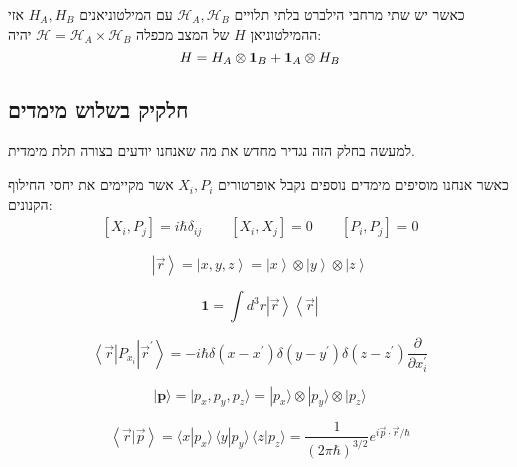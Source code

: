 \documentclass{tstextbook}
\begin{document}
\begin{proposition}
כאשר יש שתי מרחבי הילברט בלתי תלויים \(\mathcal{H}_{A},\mathcal{H}_{B}\) עם המילטוניאנים \(H_{A},H_{B}\) אזי ההמילטוניאן \(H\) של המצב מכפלה \(\mathcal{H}=\mathcal{H}_{A}\times \mathcal{H}_{B}\) יהיה:
$${ {H}}={ H}_{A}\otimes{\bf1}_{B}+{\bf1}_{A}\otimes{ H}_{B}$$

\end{proposition}
\subsection{חלקיק בשלוש מימדים}

למעשה בחלק הזה נגדיר מחדש את מה שאנחנו יודעים בצורה תלת מימדית.

\begin{proposition}
כאשר אנחנו מוסיפים מימדים נוספים נקבל אופרטורים \(X_{i},P_{i}\) אשר מקיימים את יחסי החילוף הקנונים:
$$\begin{array}{c}{{[X_{i},P_{j}]=i\hbar\delta_{i j}}}\qquad  {{[X_{i},X_{j}]=0}}\qquad  {{[P_{i},P_{j}]=0}}\end{array}$$

\end{proposition}
\begin{definition}
$$\left|\vec{r}\right\rangle=\left|x,y,z\right\rangle=\left|x\right\rangle\otimes\left|y\right\rangle\otimes\left|z\right\rangle$$

\end{definition}
\begin{proposition}
$$\mathbf{1}=\int d^{3}r\left|\vec{r}\right\rangle\left\langle\vec{r}\right|$$

\end{proposition}
\begin{proposition}
$$\left\langle\vec{r}\right|P_{x_{i}}\left|\vec{r}^{\prime}\right\rangle=-i\hbar\delta\left(x-x^{\prime}\right)\delta\left(y-y^{\prime}\right)\delta\left(z-z^{\prime}\right){\frac{\partial}{\partial x^{\prime}_{i}}}$$

\end{proposition}
\begin{definition}
$$|{\textbf{p}}\rangle=|p_{x},p_{y},p_{z}\rangle=|p_{x}\rangle\otimes|p_{y}\rangle\otimes|p_{z}\rangle$$

\end{definition}
\begin{proposition}
$$\left\langle  \vec{r}|\vec{p}  \right\rangle =\langle x|p_{x}\rangle\,\langle y|p_{y}\rangle\,\langle z|p_{z}\rangle=\frac{1}{\left(2\pi\hbar\right)^{3/2}}e^{i{\vec p}\cdot{\vec r}/\hbar}$$

\end{proposition}
\end{document}
